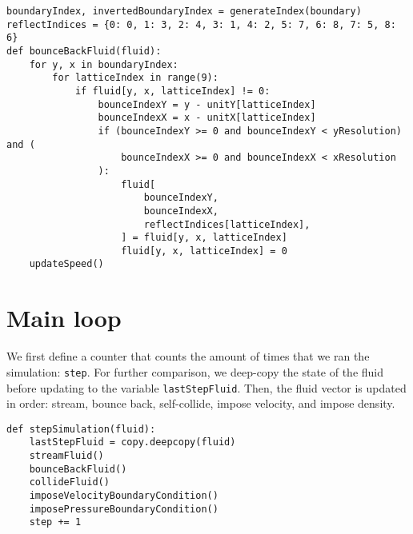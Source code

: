 \begin{verbatim}
boundaryIndex, invertedBoundaryIndex = generateIndex(boundary)
reflectIndices = {0: 0, 1: 3, 2: 4, 3: 1, 4: 2, 5: 7, 6: 8, 7: 5, 8: 6}
def bounceBackFluid(fluid):
    for y, x in boundaryIndex:
        for latticeIndex in range(9):
            if fluid[y, x, latticeIndex] != 0:
                bounceIndexY = y - unitY[latticeIndex]
                bounceIndexX = x - unitX[latticeIndex]
                if (bounceIndexY >= 0 and bounceIndexY < yResolution) and (
                    bounceIndexX >= 0 and bounceIndexX < xResolution
                ):
                    fluid[
                        bounceIndexY,
                        bounceIndexX,
                        reflectIndices[latticeIndex],
                    ] = fluid[y, x, latticeIndex]
                    fluid[y, x, latticeIndex] = 0
    updateSpeed()
\end{verbatim}

\section{Main loop}

We first define a counter that counts the amount of times that we ran the simulation: \texttt{step}. For further comparison, we deep-copy the state of the fluid before updating to the variable \texttt{lastStepFluid}. Then, the fluid vector is updated in order: stream, bounce back, self-collide, impose velocity, and impose density.
\begin{verbatim}
def stepSimulation(fluid):
    lastStepFluid = copy.deepcopy(fluid)
    streamFluid()
    bounceBackFluid()
    collideFluid()
    imposeVelocityBoundaryCondition()
    imposePressureBoundaryCondition()
    step += 1
\end{verbatim}
